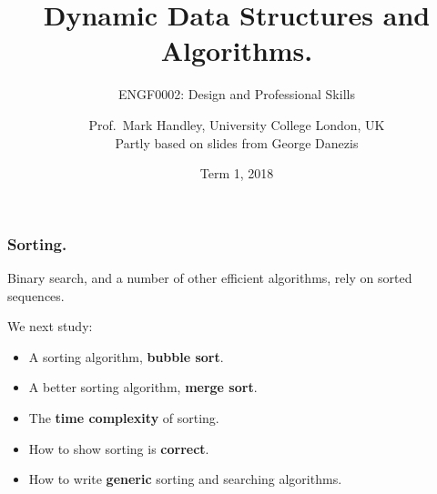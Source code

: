 \documentclass{beamer} %
\author{Prof.\ Mark Handley, University College London, UK\\
\tiny{Partly based on slides from George Danezis}}
\title{Dynamic Data Structures and Algorithms.}
\subtitle{ENGF0002: Design and Professional Skills }
\date{Term 1, 2018}
\newcommand\emc[1]{\textcolor{midred}{\textbf{#1}}}
\begin{document}
\nobibliography*


\frame{
\titlepage
}

\begin{frame}
\frametitle{Sorting.}

Binary search, and a number of other efficient algorithms, rely on sorted sequences. 

\vspace{3mm}
We next study:
\begin{itemize}
	\item A sorting algorithm, \emc{bubble sort}.
	\item A better sorting algorithm, \emc{merge sort}.
	\item The \emc{time complexity} of sorting.
	\item How to show sorting is \emc{correct}.
	\item How to write \emc{generic} sorting and searching algorithms.
\end{itemize}

\end{frame}
\end{document}
